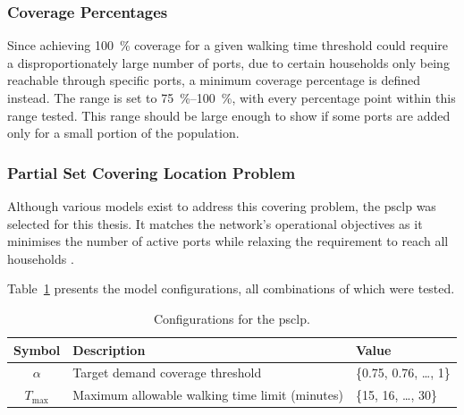 \documentclass[12pt]{article}
\begin{document}
\subsubsection{Coverage Percentages}
\label{subsubsec:coverage-percentages}

Since achieving \qty{100}{\percent} coverage for a given walking time threshold could require a disproportionately large number of ports, due to certain households only being reachable through specific ports, a minimum coverage percentage is defined instead. The range is set to \qtyrange{75}{100}{\percent}, with every percentage point within this range tested. This range should be large enough to show if some ports are added only for a small portion of the population.

\subsubsection{Partial Set Covering Location Problem}
\label{subsubsec:partial-set-covering-location-problem}

Although various models exist to address this covering problem, the \ac{psclp} was selected for this thesis. It matches the network's operational objectives as it minimises the number of active ports while relaxing the requirement to reach all households \parencite{psclp}.

Table~\ref{tab:psclp_configs} presents the model configurations, all combinations of which were tested.

\begin{table}[htbp]
  \centering
  \caption{Configurations for the \ac{psclp}.}
  \label{tab:psclp_configs}

  \begin{tabularx}{\textwidth}{c X l}
    \toprule
    \textbf{Symbol} & \textbf{Description}                           & \textbf{Value}            \\
    \midrule
    \(\alpha\)      & Target demand coverage threshold               & \{0.75, 0.76, \ldots, 1\} \\
    \(T_{\max}\)    & Maximum allowable walking time limit (minutes) & \{15, 16, \ldots, 30\}    \\
    \bottomrule
  \end{tabularx}
\end{table}
\end{document}
